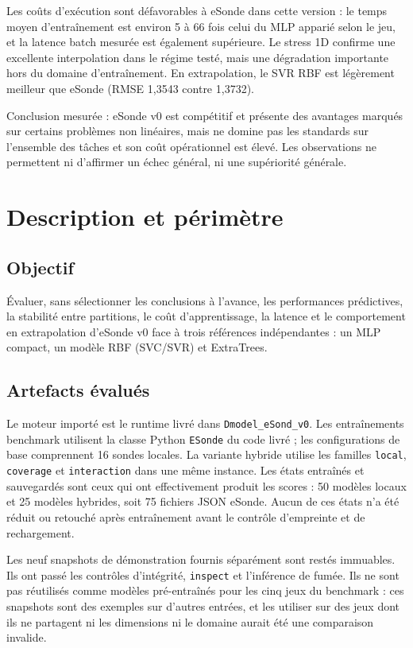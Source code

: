 \documentclass[11pt,a4paper]{article}
\begin{document}
Les coûts d'exécution sont défavorables à eSonde dans cette version : le temps moyen d'entraînement est environ 5 à 66 fois celui du MLP apparié selon le jeu, et la latence batch mesurée est également supérieure. Le stress 1D confirme une excellente interpolation dans le régime testé, mais une dégradation importante hors du domaine d'entraînement. En extrapolation, le SVR RBF est légèrement meilleur que eSonde (RMSE 1,3543 contre 1,3732).

Conclusion mesurée : eSonde v0 est compétitif et présente des avantages marqués sur certains problèmes non linéaires, mais ne domine pas les standards sur l'ensemble des tâches et son coût opérationnel est élevé. Les observations ne permettent ni d'affirmer un échec général, ni une supériorité générale.

\section{Description et périmètre}
\subsection{Objectif}
Évaluer, sans sélectionner les conclusions à l'avance, les performances prédictives, la stabilité entre partitions, le coût d'apprentissage, la latence et le comportement en extrapolation d'eSonde v0 face à trois références indépendantes : un MLP compact, un modèle RBF (SVC/SVR) et ExtraTrees.

\subsection{Artefacts évalués}
Le moteur importé est le runtime livré dans \texttt{Dmodel\_eSond\_v0}. Les entraînements benchmark utilisent la classe Python \texttt{ESonde} du code livré ; les configurations de base comprennent 16 sondes locales. La variante hybride utilise les familles \texttt{local}, \texttt{coverage} et \texttt{interaction} dans une même instance. Les états entraînés et sauvegardés sont ceux qui ont effectivement produit les scores : 50 modèles locaux et 25 modèles hybrides, soit 75 fichiers JSON eSonde. Aucun de ces états n'a été réduit ou retouché après entraînement avant le contrôle d'empreinte et de rechargement.

Les neuf snapshots de démonstration fournis séparément sont restés immuables. Ils ont passé les contrôles d'intégrité, \texttt{inspect} et l'inférence de fumée. Ils ne sont pas réutilisés comme modèles pré-entraînés pour les cinq jeux du benchmark : ces snapshots sont des exemples sur d'autres entrées, et les utiliser sur des jeux dont ils ne partagent ni les dimensions ni le domaine aurait été une comparaison invalide.
\end{document}
